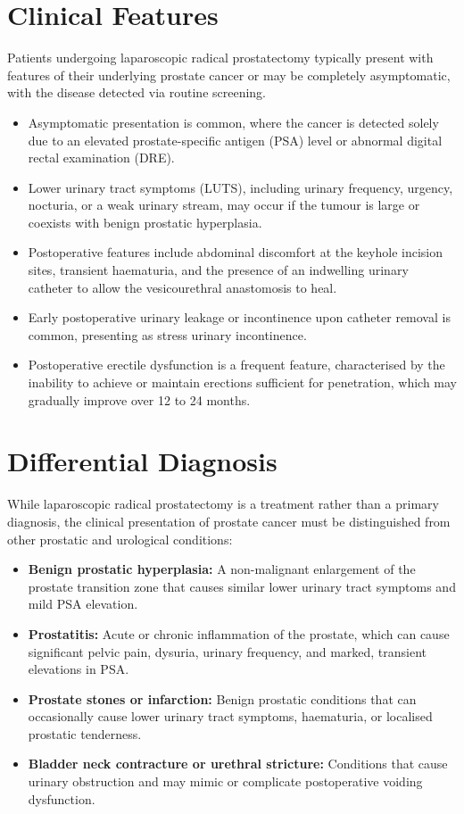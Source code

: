 \section*{Clinical Features}
Patients undergoing laparoscopic radical prostatectomy typically present with features of their underlying prostate cancer or may be completely asymptomatic, with the disease detected via routine screening.
\begin{itemize}
    \item Asymptomatic presentation is common, where the cancer is detected solely due to an elevated prostate-specific antigen (PSA) level or abnormal digital rectal examination (DRE).
    \item Lower urinary tract symptoms (LUTS), including urinary frequency, urgency, nocturia, or a weak urinary stream, may occur if the tumour is large or coexists with benign prostatic hyperplasia.
    \item Postoperative features include abdominal discomfort at the keyhole incision sites, transient haematuria, and the presence of an indwelling urinary catheter to allow the vesicourethral anastomosis to heal.
    \item Early postoperative urinary leakage or incontinence upon catheter removal is common, presenting as stress urinary incontinence.
    \item Postoperative erectile dysfunction is a frequent feature, characterised by the inability to achieve or maintain erections sufficient for penetration, which may gradually improve over 12 to 24 months.
\end{itemize}

\section*{Differential Diagnosis}
While laparoscopic radical prostatectomy is a treatment rather than a primary diagnosis, the clinical presentation of prostate cancer must be distinguished from other prostatic and urological conditions:
\begin{itemize}
    \item \textbf{Benign prostatic hyperplasia:} A non-malignant enlargement of the prostate transition zone that causes similar lower urinary tract symptoms and mild PSA elevation.
    \item \textbf{Prostatitis:} Acute or chronic inflammation of the prostate, which can cause significant pelvic pain, dysuria, urinary frequency, and marked, transient elevations in PSA.
    \item \textbf{Prostate stones or infarction:} Benign prostatic conditions that can occasionally cause lower urinary tract symptoms, haematuria, or localised prostatic tenderness.
    \item \textbf{Bladder neck contracture or urethral stricture:} Conditions that cause urinary obstruction and may mimic or complicate postoperative voiding dysfunction.
\end{itemize}

